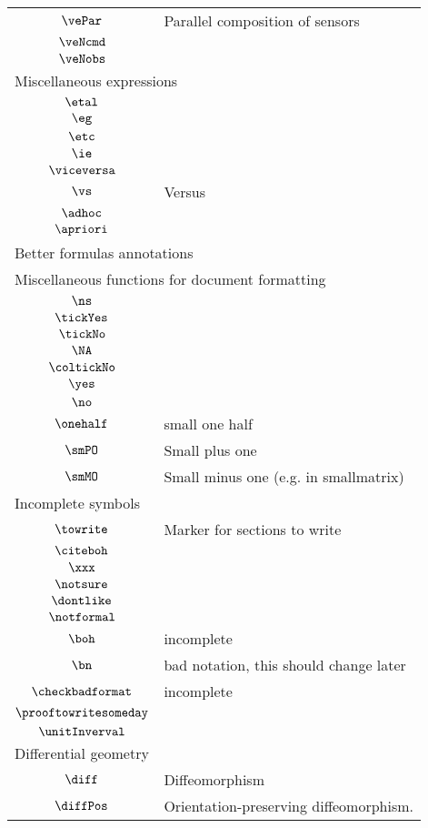 \begin{longtable}{cl}
 $\vePar$ &  Parallel composition of sensors\\ 
 $\veNcmd$ & \\ 
 $\veNobs$ & \\ 
 \multicolumn{2}{l}{Miscellaneous expressions}\\ 
 \hline
$\etal$ & \\ 
 $\eg$ & \\ 
 $\etc$ & \\ 
 $\ie$ & \\ 
 $\viceversa$ & \\ 
 $\vs$ &  Versus\\ 
 $\adhoc$ & \\ 
 $\apriori$ & \\ 
 \multicolumn{2}{l}{Better formulas annotations}\\ 
 \hline
\multicolumn{2}{l}{Miscellaneous functions for document formatting}\\ 
 \hline
$\ns$ & \\ 
 $\tickYes$ & \\ 
 $\tickNo$ & \\ 
 $\NA$ & \\ 
 $\coltickNo$ & \\ 
 $\yes$ & \\ 
 $\no$ & \\ 
 $\onehalf$ &  small one half\\ 
 $\smPO$ &  Small plus one \\ 
 $\smMO$ &  Small minus one (e.g. in smallmatrix)\\ 
 \multicolumn{2}{l}{Incomplete symbols}\\ 
 \hline
$\towrite$ &  Marker for sections to write\\ 
 $\citeboh$ & \\ 
 $\xxx$ & \\ 
 $\notsure$ & \\ 
 $\dontlike$ & \\ 
 $\notformal$ & \\ 
 $\boh$ &  incomplete\\ 
 $\bn$ &  bad notation, this should change later\\ 
 $\checkbadformat$ &  incomplete\\ 
 $\prooftowritesomeday$ & \\ 
 $\unitInverval$ & \\ 
 \multicolumn{2}{l}{Differential geometry}\\ 
 \hline
$\diff$ &  Diffeomorphism\\ 
 $\diffPos$ &  Orientation-preserving diffeomorphism.\\ 

\end{longtable}
